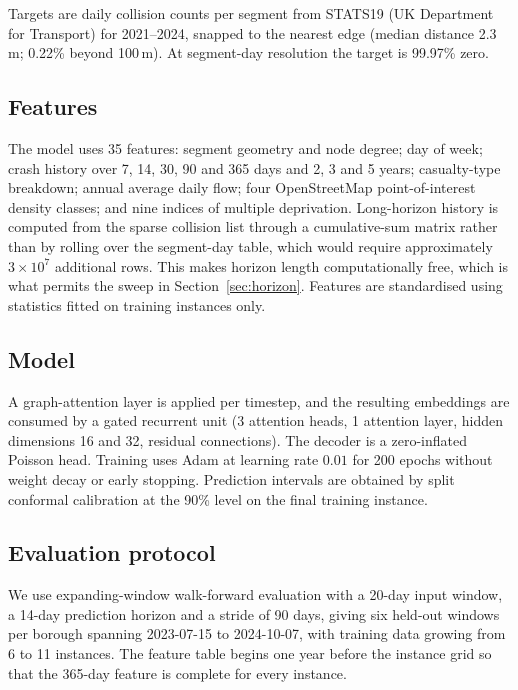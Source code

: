 \documentclass[conference]{IEEEtran}
\begin{document}
Targets are daily collision counts per segment from STATS19 (UK Department
for Transport) for 2021--2024, snapped to the nearest edge (median
distance 2.3\,m; 0.22\% beyond 100\,m). At segment-day resolution the
target is 99.97\% zero.

\subsection{Features}

The model uses 35 features: segment geometry and node degree; day of week;
crash history over 7, 14, 30, 90 and 365 days and 2, 3 and 5 years;
casualty-type breakdown; annual average daily flow; four OpenStreetMap
point-of-interest density classes; and nine indices of multiple
deprivation. Long-horizon history is computed from the sparse collision
list through a cumulative-sum matrix rather than by rolling over the
segment-day table, which would require approximately $3\times10^{7}$
additional rows. This makes horizon length computationally free, which is
what permits the sweep in Section~\ref{sec:horizon}. Features are
standardised using statistics fitted on training instances only.

\subsection{Model}

A graph-attention layer is applied per timestep, and the resulting
embeddings are consumed by a gated recurrent unit (3 attention heads, 1
attention layer, hidden dimensions 16 and 32, residual connections). The
decoder is a zero-inflated Poisson head. Training uses Adam at learning
rate $0.01$ for 200 epochs without weight decay or early stopping.
Prediction intervals are obtained by split conformal calibration at the
90\% level on the final training instance.

\subsection{Evaluation protocol}

We use expanding-window walk-forward evaluation with a 20-day input
window, a 14-day prediction horizon and a stride of 90 days, giving six
held-out windows per borough spanning 2023-07-15 to 2024-10-07, with
training data growing from 6 to 11 instances. The feature table begins one
year before the instance grid so that the 365-day feature is complete for
every instance.
\end{document}
